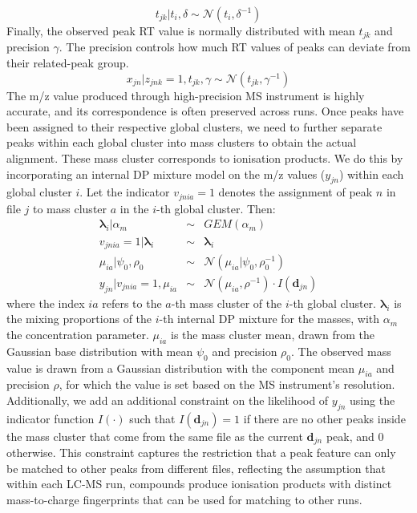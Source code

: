 \begin{equation}
	t_{jk}|t_{i},\delta\sim\mathcal{N}(t_{i},\delta^{-1})\label{eq:draw_tik}
\end{equation}
Finally, the observed peak RT value is normally distributed with mean $t_{jk}$ and precision $\gamma$. The precision controls how much RT values of peaks can deviate from their related-peak group. 
\begin{equation}
	x_{jn}|z_{jnk}=1,t_{jk},\gamma\sim\mathcal{N}(t_{jk},\gamma^{-1})\label{eq:peakdist}
\end{equation}
The m/z value produced through high-precision MS instrument is highly accurate, and its correspondence is often preserved across runs. Once peaks have been assigned to their respective global clusters, we need to further separate peaks within each global cluster into mass clusters to obtain the actual alignment. These mass cluster corresponds to ionisation products. We do this by incorporating an internal DP mixture model on the m/z values ($y_{jn}$) within each global cluster $i$. Let the
indicator $v_{jnia}=1$ denotes the assignment of peak $n$ in file $j$ to mass cluster $a$ in the $i$-th global cluster. Then: 
\begin{eqnarray}
	\boldsymbol{\lambda}_{i}|\alpha_{m} & \sim & GEM(\alpha_{m})\\
	v_{jnia}=1|\boldsymbol{\lambda}_{i} & \sim & \boldsymbol{\lambda}_{i}\\
	\mu_{ia}|\psi_{0},\rho_{0} & \sim & \mathcal{N}(\mu_{ia}|\psi_{0},\rho_{0}^{-1})\\
	y_{jn}|v_{jnia}=1,\mu_{ia} & \sim & \mathcal{N}(\mu_{ia},\rho^{-1})\cdot I(\mathbf{d}_{jn})
\end{eqnarray}
where the index $ia$ refers to the $a$-th mass cluster of the $i$-th global cluster. $\boldsymbol{\lambda}_{i}$ is the mixing proportions of the $i$-th internal DP mixture for the masses, with $\alpha_{m}$ the concentration parameter. $\mu_{ia}$ is the mass cluster mean, drawn from the Gaussian base distribution with mean $\psi_{0}$ and precision $\rho_{0}$. The observed mass value is drawn from a Gaussian distribution with the component mean $\mu_{ia}$ and precision $\rho$, for which the value is set based on the MS instrument's resolution. Additionally, we add an additional constraint on the likelihood of $y_{jn}$ using the indicator function $I(\cdot)$ such that $I(\mathbf{d}_{jn})=1$ if there are no other peaks inside the mass cluster that come from the same file as the current $\mathbf{d}_{jn}$ peak, and $0$ otherwise. This constraint captures the restriction that a peak feature can only be matched to other peaks from different files, reflecting the assumption that within each LC-MS run, compounds produce ionisation products with distinct mass-to-charge fingerprints that can be used for matching to other runs.

